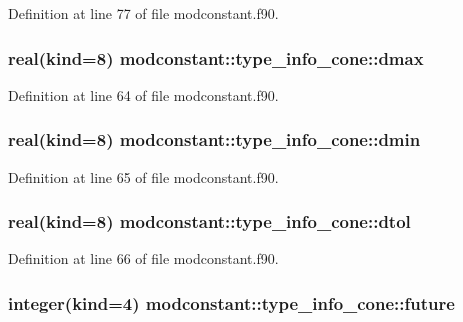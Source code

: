 Definition at line 77 of file modconstant.\-f90.

\hypertarget{structmodconstant_1_1type__info__cone_a997a63d755d54aa913445d7a3d2c217f}{
\subsubsection[{dmax}]{\setlength{\rightskip}{0pt plus 5cm}real(kind=8) modconstant\-::type\-\_\-info\-\_\-cone\-::dmax}}\label{structmodconstant_1_1type__info__cone_a997a63d755d54aa913445d7a3d2c217f}


Definition at line 64 of file modconstant.\-f90.

\hypertarget{structmodconstant_1_1type__info__cone_ad970f6e306b6ee64e764ca89d69fb477}{
\subsubsection[{dmin}]{\setlength{\rightskip}{0pt plus 5cm}real(kind=8) modconstant\-::type\-\_\-info\-\_\-cone\-::dmin}}\label{structmodconstant_1_1type__info__cone_ad970f6e306b6ee64e764ca89d69fb477}


Definition at line 65 of file modconstant.\-f90.

\hypertarget{structmodconstant_1_1type__info__cone_acdd0b05a3ae3283d16dafd1571eb1a2e}{
\subsubsection[{dtol}]{\setlength{\rightskip}{0pt plus 5cm}real(kind=8) modconstant\-::type\-\_\-info\-\_\-cone\-::dtol}}\label{structmodconstant_1_1type__info__cone_acdd0b05a3ae3283d16dafd1571eb1a2e}


Definition at line 66 of file modconstant.\-f90.

\hypertarget{structmodconstant_1_1type__info__cone_aadbe0bd1d0d5938151941cf39f8c1cbf}{
\subsubsection[{future}]{\setlength{\rightskip}{0pt plus 5cm}integer(kind=4) modconstant\-::type\-\_\-info\-\_\-cone\-::future}}\label{structmodconstant_1_1type__info__cone_aadbe0bd1d0d5938151941cf39f8c1cbf}


